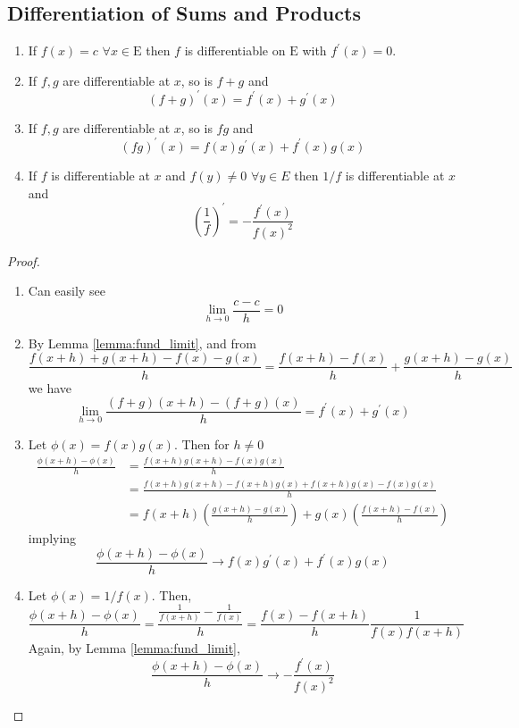 \documentclass[10pt, a4paper, twoside]{report}
\begin{document}
\subsection{Differentiation of Sums and Products}
\begin{proposition} \item[]
    \begin{enumerate}
        \item If \(f(x)=c\) \(\forall x\in\mathrm{E}\) then \(f\) is differentiable on \(\mathrm{E}\) with \(f^\prime(x)=0\).
        \item If \(f,g\) are differentiable at \(x\), so is \(f+g\) and 
        \[(f+g)^\prime(x)=f^\prime(x)+g^\prime(x)\]
        \item If \(f,g\) are differentiable at \(x\), so is \(fg\) and
        \[(fg)^\prime(x)=f(x)g^\prime(x)+f^\prime(x)g(x)\]
        \item If \(f\) is differentiable at \(x\) and \(f(y)\neq 0\) \(\forall y\in E\) then \(1/f\) is differentiable at \(x\) and 
        \[\left(\frac 1f\right)^\prime=-\frac{f^\prime(x)}{f(x)^2}\]
    \end{enumerate}
    \label{prop:diff_sp}
\end{proposition}
\begin{proof}
    \item[]
    \begin{enumerate}
        \item Can easily see
        \[\lim_{h\to 0}\frac{c-c}{h}=0\]
        \hfill\qedsymbol
        \item By Lemma \ref{lemma:fund_limit}, and from 
        \[\frac{f(x+h)+g(x+h)-f(x)-g(x)}{h}=\frac{f(x+h)-f(x)}{h}+\frac{g(x+h)-g(x)}{h}\]
        we have 
        \[\lim_{h\to 0}\frac{(f+g)(x+h)-(f+g)(x)}{h}=f^\prime(x)+g^\prime(x)\]
        \hfill\qedsymbol
        \item Let \(\phi(x)=f(x)g(x)\). Then for \(h\neq 0\)
        \begin{align*}
            \frac{\phi(x+h)-\phi(x)}{h}&=\frac{f(x+h)g(x+h)-f(x)g(x)}{h} \\
            &=\frac{f(x+h)g(x+h)-f(x+h)g(x)+f(x+h)g(x)-f(x)g(x)}{h} \\
            &=f(x+h)\left(\frac{g(x+h)-g(x)}{h}\right)+g(x)\left(\frac{f(x+h)-f(x)}{h}\right)
        \end{align*}
        implying 
        \[\frac{\phi(x+h)-\phi(x)}{h}\to f(x)g^\prime(x)+f^\prime(x)g(x)\]
        \hfill\qedsymbol
        \item Let \(\phi(x)=1/f(x)\). Then,
        \[\frac{\phi(x+h)-\phi(x)}{h}=\frac{\frac{1}{f(x+h)}-\frac{1}{f(x)}}{h}=\frac{f(x)-f(x+h)}{h}\frac{1}{f(x)f(x+h)}\]
        Again, by Lemma \ref{lemma:fund_limit}, 
        \[\frac{\phi(x+h)-\phi(x)}{h}\to-\frac{f^\prime(x)}{f(x)^2}\]
    \end{enumerate}
\end{proof}
\end{document}

